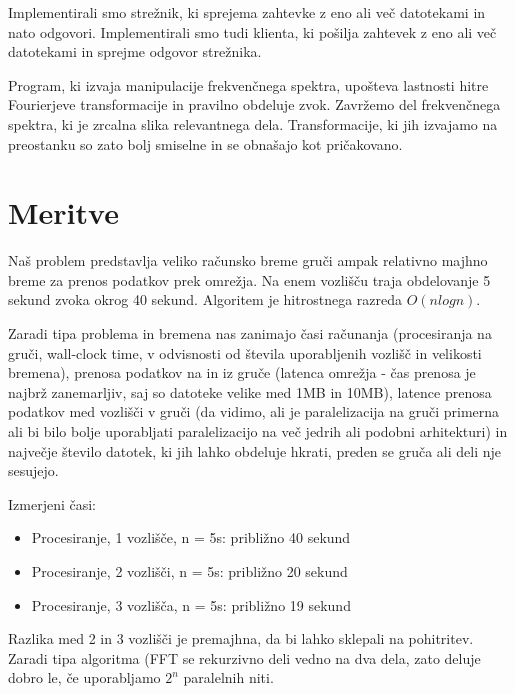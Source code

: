 \vspace{10pt}

Implementirali smo strežnik, ki sprejema zahtevke z eno ali več datotekami in nato odgovori. Implementirali smo tudi klienta, ki pošilja zahtevek z eno ali več datotekami in sprejme odgovor strežnika.

Program, ki izvaja manipulacije frekvenčnega spektra, upošteva lastnosti hitre Fourierjeve transformacije in pravilno obdeluje zvok. Zavržemo del frekvenčnega spektra, ki je zrcalna slika relevantnega dela. Transformacije, ki jih izvajamo na preostanku so zato bolj smiselne in se obnašajo kot pričakovano.

\vspace{10pt}


\section{Meritve}

Naš problem predstavlja veliko računsko breme gruči ampak relativno majhno breme za prenos podatkov prek omrežja. Na enem vozlišču traja obdelovanje 5 sekund zvoka okrog 40 sekund. Algoritem je hitrostnega razreda $O(n log n)$.

Zaradi tipa problema in bremena nas zanimajo časi računanja (procesiranja na gruči, wall-clock time, v odvisnosti od števila uporabljenih vozlišč in velikosti bremena), prenosa podatkov na in iz gruče (latenca omrežja - čas prenosa je najbrž zanemarljiv, saj so datoteke velike med 1MB in 10MB), latence prenosa podatkov med vozlišči v gruči (da vidimo, ali je paralelizacija na gruči primerna ali bi bilo bolje uporabljati paralelizacijo na več jedrih ali podobni arhitekturi) in največje število datotek, ki jih lahko obdeluje hkrati, preden se gruča ali deli nje sesujejo.

Izmerjeni časi: 
\begin{itemize}
\item Procesiranje, 1 vozlišče, n = 5s: približno 40 sekund
\item Procesiranje, 2 vozlišči, n = 5s: približno 20 sekund
\item Procesiranje, 3 vozlišča, n = 5s: približno 19 sekund
\end{itemize}

Razlika med 2 in 3 vozlišči je premajhna, da bi lahko sklepali na pohitritev. Zaradi tipa algoritma (FFT se rekurzivno deli vedno na dva dela, zato deluje dobro le, če uporabljamo $2^n$ paralelnih niti.

